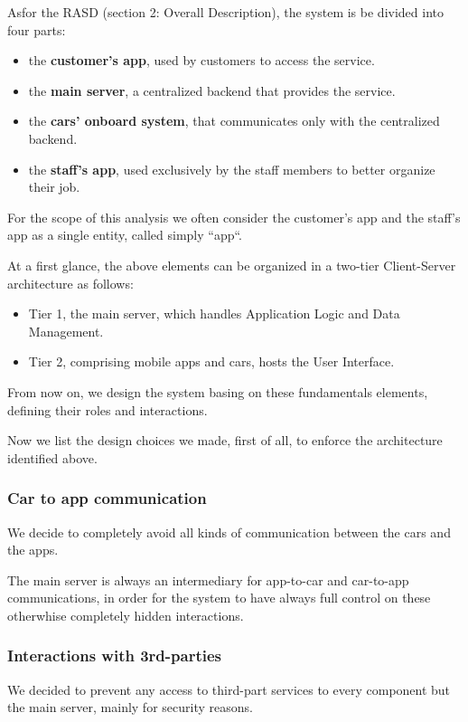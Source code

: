 \documentclass[11pt]{article} %
\begin{document}
Asfor the RASD (section 2: Overall Description), the system is be divided into four parts:
\begin{itemize}[noitemsep]
	\item the \textbf{customer's app}, used by customers to access the service.
	\item the \textbf{main server}, a centralized backend that provides the service.
	\item the \textbf{cars’ onboard system}, that communicates only with the centralized backend.
	\item the \textbf{staff's app}, used exclusively by the staff members to better organize their job.
\end{itemize}

For the scope of this analysis we often consider the customer's app and the staff's app as a single entity, called simply ``app``.

At a first glance, the above elements can be organized in a two-tier Client-Server architecture as follows:
\begin{itemize}[noitemsep]
	\item Tier 1, the main server, which handles Application Logic and Data Management.
	\item Tier 2, comprising mobile apps and cars, hosts the User Interface.
\end{itemize}
From now on, we design the system basing on these fundamentals elements, defining their roles and interactions.

Now we list the design choices we made, first of all, to enforce the architecture identified above. 

\subsubsection{Car to app communication}
We decide to completely avoid all kinds of communication between the cars and the apps. 

 The main server is always an intermediary for app-to-car and car-to-app communications, in order for the system to have always full control on these otherwhise completely hidden interactions.

\subsubsection{Interactions with 3rd-parties}
We decided to prevent any access to third-part services to every component but the main server, mainly for security reasons.
\end{document}

